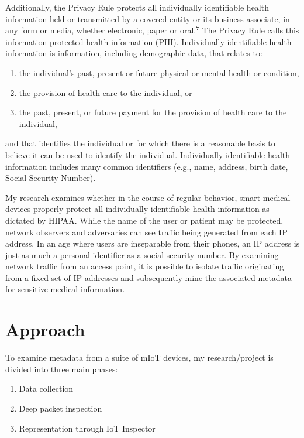 Additionally, the Privacy Rule protects all individually identifiable health information held or transmitted by a covered entity or its business associate, in any form or media, whether electronic, paper or oral.$^7$ The Privacy Rule calls this information protected health information (PHI). Individually identifiable health information is information, including demographic data, that relates to:

\begin{enumerate}
  \item the individual's past, present or future physical or mental health or condition,
  \item the provision of health care to the individual, or
  \item the past, present, or future payment for the provision of health care to the individual,
\end{enumerate}

and that identifies the individual or for which there is a reasonable basis to believe it can be used to identify the individual. Individually identifiable health information includes many common identifiers (e.g., name, address, birth date, Social Security Number).

My research examines whether in the course of regular behavior, smart medical devices properly protect all individually identifiable health information as dictated by HIPAA. While the name of the user or patient may be protected, network observers and adversaries can see traffic being generated from each IP address. In an age where users are inseparable from their phones, an IP address is just as much a personal identifier as a social security number. By examining network traffic from an access point, it is possible to isolate traffic originating from a fixed set of IP addresses and subsequently mine the associated metadata for sensitive medical information.  

\section{Approach}

To examine metadata from a suite of mIoT devices, my research/project is divided into three main phases: 

\begin{enumerate}
  \item Data collection
  \item Deep packet inspection
  \item Representation through IoT Inspector
\end{enumerate}

